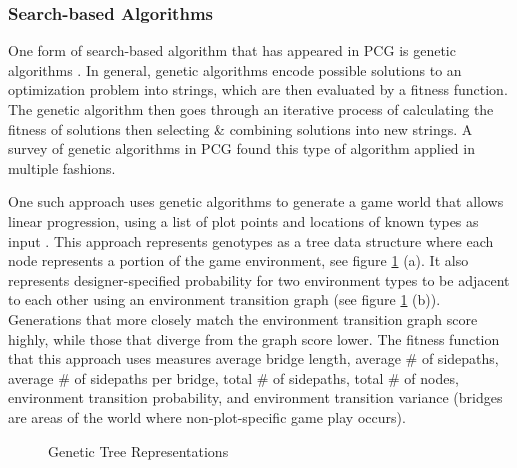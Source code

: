 \documentclass[11pt, oneside]{article}
\begin{document}
\begin{normalsize}
\subsubsection{Search-based Algorithms}

One form of search-based algorithm that has appeared in PCG is genetic algorithms \cite{togelius2011search}. In general, genetic algorithms encode possible solutions to an optimization problem into strings, which are then evaluated by a fitness function. The genetic algorithm then goes through an iterative process of calculating the fitness of solutions then selecting \& combining solutions into new strings. A survey of genetic algorithms in PCG found this type of algorithm applied in multiple fashions.

One such approach uses genetic algorithms to generate a game world that allows linear progression, using a list of plot points and locations of known types as input \cite{hartsook2011toward}. This approach represents genotypes as a tree data structure where each node represents a portion of the game environment, see figure \ref{fig:gen} (a). It also represents designer-specified probability for two environment types to be adjacent to each other using an environment transition graph (see figure \ref{fig:gen} (b)). Generations that more closely match the environment transition graph score highly, while those that diverge from the graph score lower. The fitness function that this approach uses measures average bridge length, average \# of sidepaths, average \# of sidepaths per bridge, total \# of sidepaths, total \# of nodes, environment transition probability, and environment transition variance (bridges are areas of the world where non-plot-specific game play occurs).

\begin{figure}[H]%
    \centering
    \qquad
    \caption{Genetic Tree Representations}%
    \label{fig:gen}%
\end{figure}


\end{normalsize}
\end{document}
